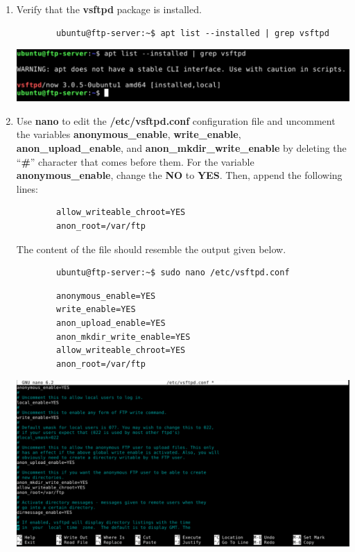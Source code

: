 \documentclass[letterpaper, 12pt]{article}
\begin{document}
\begin{enumerate}
    \item Verify that the \textbf{vsftpd} package is installed.
    \begin{lstlisting}
        ubuntu@ftp-server:~$ apt list --installed | grep vsftpd
    \end{lstlisting}

    \begin{center}
        \includegraphics[width=\linewidth]{images/part2/step9.png}
    \end{center}

    \item Use \textbf{nano} to edit the \textbf{/etc/vsftpd.conf} configuration file and uncomment the variables \textbf{anonymous\_enable}, \textbf{write\_enable}, \textbf{anon\_upload\_enable}, and \textbf{anon\_mkdir\_write\_enable} by deleting the ``\textbf{\#}'' character that comes before them.
    For the variable \textbf{anonymous\_enable}, change the \textbf{NO} to \textbf{YES}.
    Then, append the following lines:
    \begin{lstlisting}
        allow_writeable_chroot=YES
        anon_root=/var/ftp
    \end{lstlisting}
    The content of the file should resemble the output given below.
    \begin{lstlisting}
        ubuntu@ftp-server:~$ sudo nano /etc/vsftpd.conf
    \end{lstlisting}
    \begin{lstlisting}
        anonymous_enable=YES
        write_enable=YES
        anon_upload_enable=YES
        anon_mkdir_write_enable=YES
        allow_writeable_chroot=YES
        anon_root=/var/ftp
    \end{lstlisting}

    \begin{center}
        \includegraphics[width=\linewidth]{images/part2/step10.png}
    \end{center}


\end{enumerate}
\end{document}
